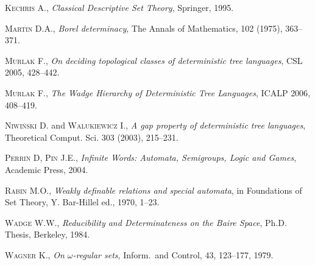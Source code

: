 \begin{thebibliography}{00}
\textsc{Kechris} A., \emph{Classical Descriptive Set Theory}, Springer, \textsc{1995}.


\textsc{Martin} D.A., \emph{Borel determinacy}, The Annals of Mathematics, \textsc{102} (1975), 363--371.


\textsc{Murlak} F., \emph{On deciding topological classes of deterministic tree languages}, CSL \textsc{2005}, 428--442. 

\textsc{Murlak} F., \emph{The Wadge Hierarchy of Deterministic Tree Languages}, ICALP \textsc{2006}, 408--419. 

\textsc{Niwiński} D. and \textsc{Walukiewicz} I., \emph{A gap property of deterministic tree languages}, Theoretical Comput. Sci. \textsc{303} (2003), 215--231.



\textsc{Perrin} D, \textsc{Pin} J.E., \emph{Infinite Words: Automata, Semigroups, Logic and Games}, Academic Press, \textsc{2004}.

\textsc{Rabin} M.O., \emph{Weakly definable relations and special automata}, in Foundations of Set Theory, Y. Bar-Hillel ed., \textsc{1970}, 1--23.

\textsc{Wadge} W.W., \emph{Reducibility and Determinateness on the Baire Space}, Ph.D. Thesis, Berkeley, \textsc{1984}.

\textsc{Wagner} K., \emph{On $\omega$-regular sets}, Inform.~and Control, \textsc{43}, 123--177, 1979. 

\end{thebibliography}
